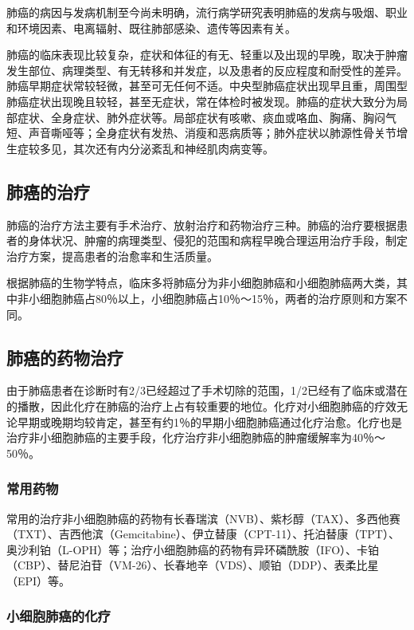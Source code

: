 肺癌的病因与发病机制至今尚未明确，流行病学研究表明肺癌的发病与吸烟、职业和环境因素、电离辐射、既往肺部感染、遗传等因素有关。

肺癌的临床表现比较复杂，症状和体征的有无、轻重以及出现的早晚，取决于肿瘤发生部位、病理类型、有无转移和并发症，以及患者的反应程度和耐受性的差异。肺癌早期症状常较轻微，甚至可无任何不适。中央型肺癌症状出现早且重，周围型肺癌症状出现晚且较轻，甚至无症状，常在体检时被发现。肺癌的症状大致分为局部症状、全身症状、肺外症状等。局部症状有咳嗽、痰血或咯血、胸痛、胸闷气短、声音嘶哑等；全身症状有发热、消瘦和恶病质等；肺外症状以肺源性骨关节增生症较多见，其次还有内分泌紊乱和神经肌肉病变等。

\subsection{肺癌的治疗}

肺癌的治疗方法主要有手术治疗、放射治疗和药物治疗三种。肺癌的治疗要根据患者的身体状况、肿瘤的病理类型、侵犯的范围和病程早晚合理运用治疗手段，制定治疗方案，提高患者的治愈率和生活质量。

根据肺癌的生物学特点，临床多将肺癌分为非小细胞肺癌和小细胞肺癌两大类，其中非小细胞肺癌占80％以上，小细胞肺癌占10％～15％，两者的治疗原则和方案不同。

\subsection{肺癌的药物治疗}

由于肺癌患者在诊断时有2/3已经超过了手术切除的范围，1/2已经有了临床或潜在的播散，因此化疗在肺癌的治疗上占有较重要的地位。化疗对小细胞肺癌的疗效无论早期或晚期均较肯定，甚至有约1％的早期小细胞肺癌通过化疗治愈。化疗也是治疗非小细胞肺癌的主要手段，化疗治疗非小细胞肺癌的肿瘤缓解率为40％～50％。

\subsubsection{常用药物}

常用的治疗非小细胞肺癌的药物有长春瑞滨（NVB）、紫杉醇（TAX）、多西他赛（TXT）、吉西他滨（Gemcitabine）、伊立替康（CPT-11）、托泊替康（TPT）、奥沙利铂（L-OPH）等；治疗小细胞肺癌的药物有异环磷酰胺（IFO）、卡铂（CBP）、替尼泊苷（VM-26）、长春地辛（VDS）、顺铂（DDP）、表柔比星（EPI）等。

\subsubsection{小细胞肺癌的化疗}

